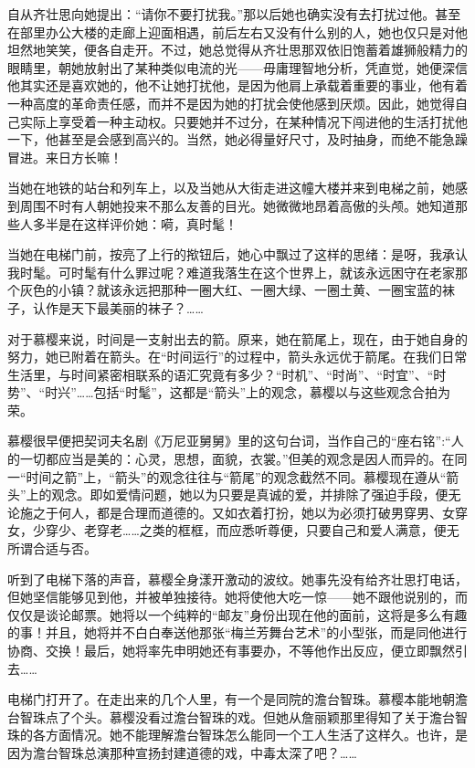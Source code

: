 \par 自从齐壮思向她提出：“请你不要打扰我。”那以后她也确实没有去打扰过他。甚至在部里办公大楼的走廊上迎面相遇，前后左右又没有什么别的人，她也仅只是对他坦然地笑笑，便各自走开。不过，她总觉得从齐壮思那双依旧饱蓄着雄狮般精力的眼睛里，朝她放射出了某种类似电流的光——毋庸理智地分析，凭直觉，她便深信他其实还是喜欢她的，他不让她打扰他，是因为他肩上承载着重要的事业，他有着一种高度的革命责任感，而并不是因为她的打扰会使他感到厌烦。因此，她觉得自己实际上享受着一种主动权。只要她并不过分，在某种情况下闯进他的生活打扰他一下，他甚至是会感到高兴的。当然，她必得量好尺寸，及时抽身，而绝不能急躁冒进。来日方长嘛！
\par 当她在地铁的站台和列车上，以及当她从大街走进这幢大楼并来到电梯之前，她感到周围不时有人朝她投来不那么友善的目光。她微微地昂着高傲的头颅。她知道那些人多半是在这样评价她：嗬，真时髦！
\par 当她在电梯门前，按亮了上行的揿钮后，她心中飘过了这样的思绪：是呀，我承认我时髦。可时髦有什么罪过呢？难道我落生在这个世界上，就该永远困守在老家那个灰色的小镇？就该永远把那种一圈大红、一圈大绿、一圈土黄、一圈宝蓝的袜子，认作是天下最美丽的袜子？……
\par 对于慕樱来说，时间是一支射出去的箭。原来，她在箭尾上，现在，由于她自身的努力，她已附着在箭头。在“时间运行”的过程中，箭头永远优于箭尾。在我们日常生活里，与时间紧密相联系的语汇究竟有多少？“时机”、“时尚”、“时宜”、“时势”、“时兴”……包括“时髦”，这都是“箭头”上的观念，慕樱以与这些观念合拍为荣。
\par 慕樱很早便把契诃夫名剧《万尼亚舅舅》里的这句台词，当作自己的“座右铭”:“人的一切都应当是美的：心灵，思想，面貌，衣裳。”但美的观念是因人而异的。在同一“时间之箭”上，“箭头”的观念往往与“箭尾”的观念截然不同。慕樱现在遵从“箭头”上的观念。即如爱情问题，她以为只要是真诚的爱，并排除了强迫手段，便无论施之于何人，都是合理而道德的。又如衣着打扮，她以为必须打破男穿男、女穿女，少穿少、老穿老……之类的框框，而应悉听尊便，只要自己和爱人满意，便无所谓合适与否。
\par 听到了电梯下落的声音，慕樱全身漾开激动的波纹。她事先没有给齐壮思打电话，但她坚信能够见到他，并被单独接待。她将使他大吃一惊——她不跟他说别的，而仅仅是谈论邮票。她将以一个纯粹的“邮友”身份出现在他的面前，这将是多么有趣的事！并且，她将并不白白奉送他那张“梅兰芳舞台艺术”的小型张，而是同他进行协商、交换！最后，她将率先申明她还有事要办，不等他作出反应，便立即飘然引去……
\par 电梯门打开了。在走出来的几个人里，有一个是同院的澹台智珠。慕樱本能地朝澹台智珠点了个头。慕樱没看过澹台智珠的戏。但她从詹丽颖那里得知了关于澹台智珠的各方面情况。她不能理解澹台智珠怎么能同一个工人生活了这样久。也许，是因为澹台智珠总演那种宣扬封建道德的戏，中毒太深了吧？……
